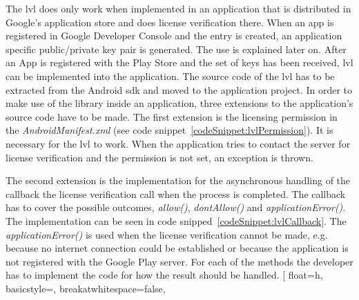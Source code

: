 The \gls{lvl} does only work when implemented in an application that is distributed in Google's application store and does license verification there.
When an app is registered in Google Developer Console and the entry is created, an application specific public/private key pair is generated.
The use is explained later on. \cite{developersLicensingSetup}
\newline
After an App is registered with the Play Store and the set of keys has been received, \gls{lvl} can be implemented into the application.
The source code of the \gls{lvl} has to be extracted from the Android \gls{sdk} and moved to the application project.
In order to make use of the library inside an application, three extensions to the application's source code have to be made.
 \cite{digipomLvl} \cite{developersLicensingOverview}
\newline
The first extension is the licensing permission in the \textit{AndroidManifest.xml} (see code snippet~\ref{codeSnippet:lvlPermission}).
It is necessary for the \gls{lvl} to work.
When the application tries to contact the server for license verification and the permission is not set, an exception is thrown. \cite{developersLicensingSetup} \cite{developersLicensingAdding}
\newline

The second extension is the implementation for the asynchronous handling of the callback the license verification call when the process is completed.
The callback has to cover the possible outcomes, \textit{allow()}, \textit{dontAllow()} and \textit{applicationError()}.
The implementation can be seen in code snipped~\ref{codeSnippet:lvlCallback}.
The \textit{applicationError()} is used when the license verification cannot be made, e.g. because no internet connection could be established or because the application is not registered with the Google Play server.
For each of the methods the developer has to implement the code for how the result should be handled. \cite{developersLicensingOverview} \cite{developersLicensingSetup} \cite{developersLicensingAdding} \cite{digipomLvl}
\newline
[
  float=h,
  basicstyle=\footnotesize,
  breakatwhitespace=false,
